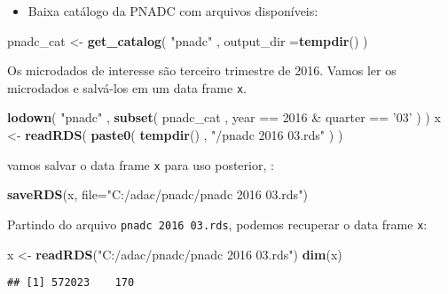 \documentclass[]{book}
\newenvironment{Shaded}{\begin{snugshade}}{\end{snugshade}}
\newcommand{\KeywordTok}[1]{\textcolor[rgb]{0.13,0.29,0.53}{\textbf{{#1}}}}
\newcommand{\DataTypeTok}[1]{\textcolor[rgb]{0.13,0.29,0.53}{{#1}}}
\newcommand{\DecValTok}[1]{\textcolor[rgb]{0.00,0.00,0.81}{{#1}}}
\newcommand{\StringTok}[1]{\textcolor[rgb]{0.31,0.60,0.02}{{#1}}}
\newcommand{\NormalTok}[1]{{#1}}
\providecommand{\tightlist}{%
  \setlength{\itemsep}{0pt}\setlength{\parskip}{0pt}}
\numberwithin{example}{chapter}
\numberwithin{remark}{chapter}
\numberwithin{definition}{chapter}
\begin{document}
\begin{itemize}
\tightlist
\item
  Baixa catálogo da PNADC com arquivos disponíveis:
\end{itemize}

\begin{Shaded}
\begin{Highlighting}[]
\NormalTok{pnadc_cat <-}\StringTok{ }\KeywordTok{get_catalog}\NormalTok{( }\StringTok{"pnadc"} \NormalTok{, }\DataTypeTok{output_dir =}\KeywordTok{tempdir}\NormalTok{() )}
\end{Highlighting}
\end{Shaded}

Os microdados de interesse são terceiro trimestre de 2016. Vamos ler os
microdados e salvá-los em um data frame \texttt{x}.

\begin{Shaded}
\begin{Highlighting}[]
\KeywordTok{lodown}\NormalTok{( }\StringTok{"pnadc"} \NormalTok{, }\KeywordTok{subset}\NormalTok{( pnadc_cat , year ==}\StringTok{ }\DecValTok{2016} \NormalTok{&}\StringTok{ }\NormalTok{quarter ==}\StringTok{ '03'} \NormalTok{) )}
\NormalTok{x <-}\StringTok{ }\KeywordTok{readRDS}\NormalTok{( }\KeywordTok{paste0}\NormalTok{( }\KeywordTok{tempdir}\NormalTok{() , }\StringTok{"/pnadc 2016 03.rds"} \NormalTok{) )}
\end{Highlighting}
\end{Shaded}

vamos salvar o data frame \texttt{x} para uso posterior, :

\begin{Shaded}
\begin{Highlighting}[]
\KeywordTok{saveRDS}\NormalTok{(x, }\DataTypeTok{file=}\StringTok{"C:/adac/pnadc/pnadc 2016 03.rds"}\NormalTok{)}
\end{Highlighting}
\end{Shaded}

Partindo do arquivo \texttt{pnadc\ 2016\ 03.rds}, podemos recuperar o
data frame \texttt{x}:

\begin{Shaded}
\begin{Highlighting}[]
\NormalTok{x <-}\StringTok{ }\KeywordTok{readRDS}\NormalTok{(}\StringTok{"C:/adac/pnadc/pnadc 2016 03.rds"}\NormalTok{)}
\KeywordTok{dim}\NormalTok{(x)}
\end{Highlighting}
\end{Shaded}

\begin{verbatim}
## [1] 572023    170
\end{verbatim}
\end{document}
